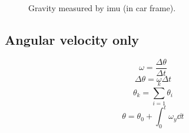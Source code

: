 \begin{figure}[htpb]
    \centering
    
    \caption{Gravity measured by \acrshort{imu} (in car frame).}
    \label{fig:tikz_car_gravity1}
\end{figure}

\subsection{Angular velocity only}
\begin{equation}
    \omega = \frac{\Delta\theta}{\Delta t}
\end{equation}
\begin{equation}
    \Delta\theta = \omega\Delta t
\end{equation}
\begin{equation}
    \theta_k = \sum_{i = 1}^k \theta_i
\end{equation}
\begin{equation}
    \theta = \theta_0 + \int_0^t \omega_y \dd{t}
\end{equation}


